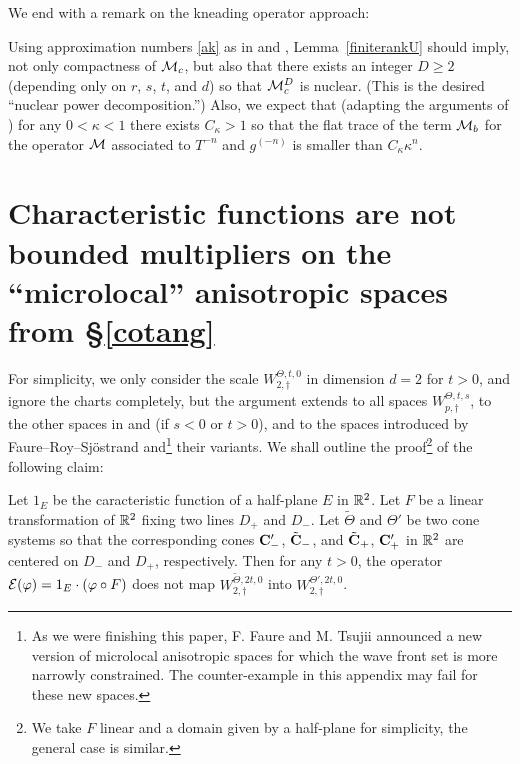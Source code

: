 \documentclass[10pt,twoside]{amsart}
\begin{document}
We end with a remark on the kneading operator approach:

\begin{remark}\label{nucc}Using approximation numbers
\eqref{ak}  as
in \cite{BT2} and \cite{Ba},
  Lemma~\ref{finiterankU}   should imply, not only compactness of $\mathcal{M}_c$, but also that
 there exists an integer $D\ge 2$
(depending only on $r$, $s$, $t$, and $d$) so that $\mathcal{M}_c^D$ is nuclear.
(This is the desired ``nuclear power decomposition.'')
Also, we expect that  
(adapting the arguments of \cite{BT2, Ba})  
for any $0<\kappa<1$ there exists $C_\kappa>1$ so that the 
flat trace \cite{BT2} of the term $\mathcal{M}_b$ for the operator $\mathcal{M}$  associated
to $T^{-n}$ and $g^{(-n)}$ is smaller than  $C_\kappa \kappa^n$. 
\end{remark}



\appendix




\section{Characteristic functions are not  bounded multipliers on the ``microlocal''
anisotropic spaces from \S\ref{cotang}}
\label{nomult}

For simplicity, we only consider
the scale $W^{\Theta,t,0}_{2,\dagger}$ in dimension $d=2$ for $t>0$, and ignore the charts completely, but
 the  argument
extends to all spaces $W^{\Theta,t,s}_{p,\dagger}$, to  the other spaces in \cite{BT1} and
 \cite{BT2} (if $s<0$ or $t>0$), and to the spaces introduced by Faure--Roy--Sj\"ostrand
\cite{FRS} and\footnote{\label{maybe}As we were finishing this paper, F. Faure and M. Tsujii 
\cite{FaTsm} announced a new version of microlocal anisotropic spaces for
which the wave front set is more narrowly constrained. The counter-example
in this appendix may fail for these new spaces.} their variants. 
 We shall outline the proof\footnote{We take  $F$ linear and a domain given by a half-plane for simplicity, the general case is similar.} of the following claim:

\begin{proposition}\label{GGG}
Let $1_E$ be the caracteristic function of a half-plane
$E$ in $\mathbb{R}^2$.
Let  $F$ be a linear transformation of $\mathbb{R}^2$ fixing two lines $D_+$ and $D_-$. Let 
$\widetilde \Theta$ and $\Theta'$ be two cone systems so that
the corresponding cones $\mathbf{C}'_-$,  
$\tilde {\mathbf{C}}_-$, and $\tilde {\mathbf{C}}_+$, $\mathbf{C}'_+$ in $\mathbb{R}^2$ are centered on $D_-$ and $D_+$, respectively. Then
for any $t>0$,  the operator $\mathcal{E} (\varphi) = 1_E \cdot (\varphi \circ F)$ does not map
$W^{\widetilde \Theta, 2t,0}_{2,\dagger}$ into $W^{\Theta',2t,0}_{2,\dagger}$.
\end{proposition}
\end{document}
